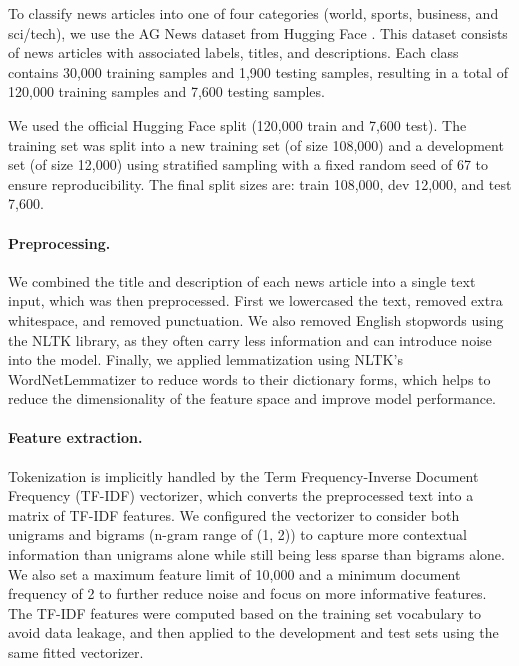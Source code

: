 To classify news articles into one of four categories (world, sports, business, and sci/tech), we use the AG News dataset from Hugging Face \cite{zhang2015character}. This dataset consists of news articles with associated labels, titles, and descriptions. Each class contains 30,000 training samples and 1,900 testing samples, resulting in a total of 120,000 training samples and 7,600 testing samples.

We used the official Hugging Face split (120,000 train and 7,600 test). The training set was split into a new training set (of size 108,000) and a development set (of size 12,000) using stratified sampling with a fixed random seed of 67 to ensure reproducibility. The final split sizes are: train 108,000, dev 12,000, and test 7,600.

\paragraph{Preprocessing.} We combined the title and description of each news article into a single text input, which was then preprocessed. First we lowercased the text, removed extra whitespace, and removed punctuation. We also removed English stopwords using the NLTK library, as they often carry less information and can introduce noise into the model. Finally, we applied lemmatization using NLTK's WordNetLemmatizer to reduce words to their dictionary forms, which helps to reduce the dimensionality of the feature space and improve model performance.



\paragraph{Feature extraction.} Tokenization is implicitly handled by the Term Frequency-Inverse Document Frequency (TF-IDF) vectorizer, which converts the preprocessed text into a matrix of TF-IDF features. We configured the vectorizer to consider both unigrams and bigrams (n-gram range of (1, 2)) to capture more contextual information than unigrams alone while still being less sparse than bigrams alone. We also set a maximum feature limit of 10,000 and a minimum document frequency of 2 to further reduce noise and focus on more informative features. The TF-IDF features were computed based on the training set vocabulary to avoid data leakage, and then applied to the development and test sets using the same fitted vectorizer.